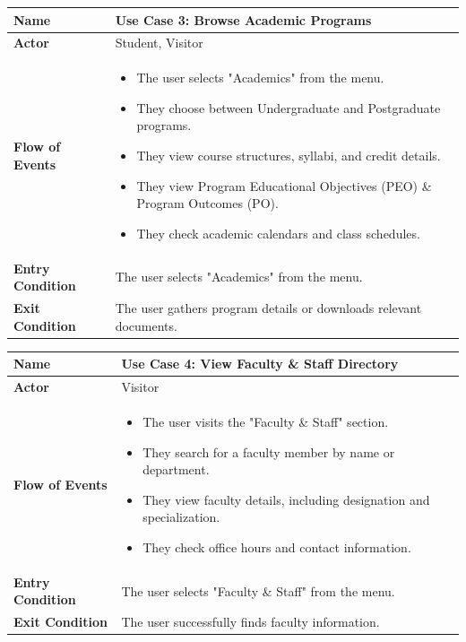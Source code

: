 \documentclass[11pt]{article}
\begin{document}
\begin{center}
\begin{tabular}{ | >{\bfseries}m{6em} | m{10cm} | }
  \hline
  \textbf{Name} & Use Case 3: Browse Academic Programs \\
  \hline
  \textbf{Actor} & Student, Visitor \\
  \hline
  \textbf{Flow of Events} & 
  \begin{itemize}
      \item The user selects "Academics" from the menu.
      \item They choose between Undergraduate and Postgraduate programs.
      \item They view course structures, syllabi, and credit details.
      \item They view Program Educational Objectives (PEO) \& Program Outcomes (PO).
      \item They check academic calendars and class schedules.
  \end{itemize} \\
  \hline
  \textbf{Entry Condition} & The user selects "Academics" from the menu. \\
  \hline
  \textbf{Exit Condition} & The user gathers program details or downloads relevant documents. \\
  \hline
\end{tabular}
\end{center}

\begin{center}
\begin{tabular}{ | >{\bfseries}m{6em} | m{10cm} | }
  \hline
  \textbf{Name} & Use Case 4: View Faculty \& Staff Directory \\
  \hline
  \textbf{Actor} & Visitor \\
  \hline
  \textbf{Flow of Events} & 
  \begin{itemize}
      \item The user visits the "Faculty \& Staff" section.
      \item They search for a faculty member by name or department.
      \item They view faculty details, including designation and specialization.
      \item They check office hours and contact information.
  \end{itemize} \\
  \hline
  \textbf{Entry Condition} & The user selects "Faculty \& Staff" from the menu. \\
  \hline
  \textbf{Exit Condition} & The user successfully finds faculty information. \\
  \hline
\end{tabular}
\end{center}
\end{document}
